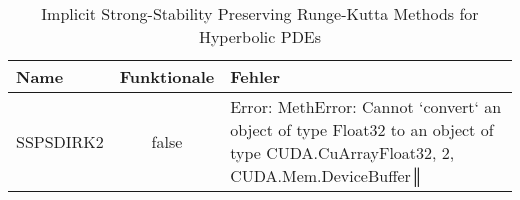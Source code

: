 \begin{table}[H]
    \centering

    \begin{tabular}{p{5cm}|c|p{5cm}}
        Name & Funktionale & Fehler \\
        \hline\hline
        SSPSDIRK2 & false & Error: MethError: Cannot `convert` an object of type Float32 to an object of type CUDA.CuArray{Float32, 2, CUDA.Mem.DeviceBuffer}║ \\        
    \end{tabular}
    \caption{Implicit Strong-Stability Preserving Runge-Kutta Methods for Hyperbolic PDEs}
    \label{tab:my_label}
\end{table}
